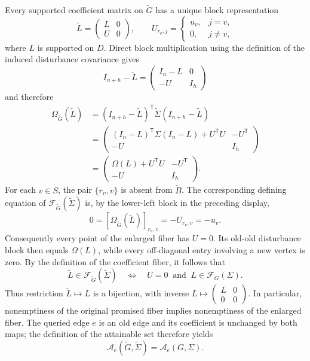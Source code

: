 Every supported coefficient matrix on \(\widetilde G\) has a unique block representation
\[
\widetilde L=
\begin{pmatrix}
L&0\\
U&0
\end{pmatrix},
\qquad
U_{r_v,j}=
\begin{cases}
u_v,&j=v,\\
0,&j\ne v,
\end{cases}
\]
where \(L\) is supported on \(D\).  Direct block multiplication using the definition of the induced disturbance covariance gives
\[
I_{n+h}-\widetilde L
=
\begin{pmatrix}
I_n-L&0\\
-U&I_h
\end{pmatrix}
\]
and therefore
\[
\begin{aligned}
\Omega_{\widetilde G}(\widetilde L)
&=(I_{n+h}-\widetilde L)^{\mathsf T}
  \widetilde\Sigma
  (I_{n+h}-\widetilde L)\\
&=
\begin{pmatrix}
(I_n-L)^{\mathsf T}\Sigma(I_n-L)+U^{\mathsf T}U&-U^{\mathsf T}\\
-U&I_h
\end{pmatrix}\\
&=
\begin{pmatrix}
\Omega(L)+U^{\mathsf T}U&-U^{\mathsf T}\\
-U&I_h
\end{pmatrix}.
\end{aligned}
\]
For each \(v\in S\), the pair \(\{r_v,v\}\) is absent from \(\widetilde B\).  The corresponding defining equation of \(\mathcal F_{\widetilde G}(\widetilde\Sigma)\) is, by the lower-left block in the preceding display,
\[
0=[\Omega_{\widetilde G}(\widetilde L)]_{r_v,v}=-U_{r_v,v}=-u_v.
\]
Consequently every point of the enlarged fiber has \(U=0\).  Its old-old disturbance block then equals \(\Omega(L)\), while every off-diagonal entry involving a new vertex is zero.  By the definition of the coefficient fiber, it follows that
\[
\widetilde L\in\mathcal F_{\widetilde G}(\widetilde\Sigma)
\quad\Longleftrightarrow\quad
U=0\ \text{ and }\ L\in\mathcal F_G(\Sigma).
\]
Thus restriction \(\widetilde L\mapsto L\) is a bijection, with inverse \(L\mapsto\left(\begin{smallmatrix}L&0\\0&0\end{smallmatrix}\right)\).  In particular, nonemptiness of the original promised fiber implies nonemptiness of the enlarged fiber.  The queried edge \(e\) is an old edge and its coefficient is unchanged by both maps; the definition of the attainable set therefore yields
\[
\mathcal A_e(\widetilde G,\widetilde\Sigma)
=\mathcal A_e(G,\Sigma).
\]

